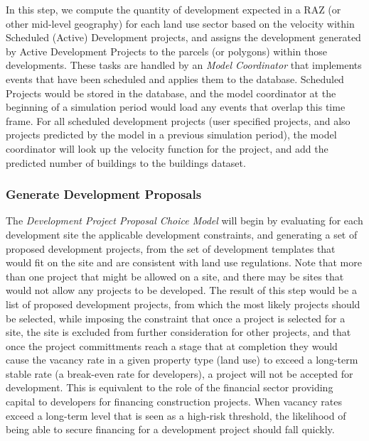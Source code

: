 In this step, we compute the quantity of development expected in a RAZ (or other mid-level geography) for each land use
sector based on the velocity within Scheduled (Active) Development projects, and assigns the development generated
by Active Development Projects to the parcels (or polygons) within those developments.  These tasks are
handled by an \emph{Model Coordinator} that implements events that have been scheduled and applies
them to the database.  Scheduled Projects would be stored in the database, and the model coordinator
at the beginning of a simulation period would load any events that overlap this time frame.  For all scheduled
development projects (user specified projects, and also projects predicted by the model in a previous simulation
period), the model coordinator will look up the velocity function for the project, and add the predicted number
of buildings to the buildings dataset. 

\subsubsection{Generate Development Proposals}

The \emph{Development Project Proposal Choice Model} will begin by evaluating for each development site 
the applicable development constraints, and
generating a set of proposed development projects, from the set of development templates
that would fit on the site and are consistent with land use regulations.  
Note that more than one project that might be allowed on a site, and
there may be sites that would not allow any projects to be developed.  The result of this step
would be a list of proposed development projects, from which the most likely projects should be
selected, while imposing the constraint that once a project is selected for a site, the site is
excluded from further consideration for other projects, and that once the project committments
reach a stage that at completion they would cause the vacancy rate in a given property type (land
use) to exceed a long-term stable rate (a break-even rate for developers), a project will not be
accepted for development.  This is equivalent to the role of the financial sector providing
capital to developers for financing construction projects. When vacancy rates exceed a long-term
level that is seen as a high-risk threshold, the likelihood of being able to secure financing for
a development project should fall quickly.

